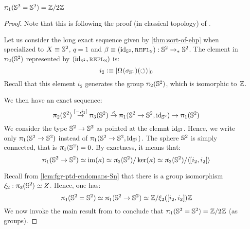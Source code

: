 \documentclass[english,a4paper]{lmcs}
\begin{document}
\begin{thm} \label{thm:Sp-sym=Z/2}
  $\uppi_{1} ({{\mathbb S^{2}}} = {{\mathbb S^{2}}}) = \mathbb{Z}/2 \mathbb{Z}$
  \label{thm:S2-eq-S2-not-simply-connected}
\end{thm}
\begin{proof}
  Note that this is following the proof (in classical topology) of \cite{gwwhitehead}.

  Let us consider the long exact sequence given by \cref{thm:sort-of-ehp} when
  specialized to $X \equiv {{\mathbb S^{2}}}$, $q=1$ and $\beta\equiv (\mathord{\mathrm{id}}_{{\mathbb S^{2}}}, \mathop{{\textsc{refl}}_{\textsc{n}}}): {{\mathbb S^{2}}}
  \to_\ast {{\mathbb S^{2}}}$. The element in $\uppi_{2}({{\mathbb S^{2}}})$ represented by $(\mathord{\mathrm{id}}_{{\mathbb S^{2}}}, \mathop{{\textsc{refl}}_{\textsc{n}}})$
  is:
  \begin{equation}
    i_2 \vcentcolon\equiv \lvert\mathop{\Omega^{}}(\sigma_{{\mathbb S^{1}}})(\mathord{\circlearrowleft})\rvert_0
    \label{eq:def-i2-gen-pi2S2}
  \end{equation}
  Recall that this element $i_2$ generates the group $\uppi_{2}({{\mathbb S^{2}}})$, which is
  isomorphic to $\mathbb{Z}$.

  We then have an exact sequence:
  \begin{equation}
    \hgr 2(\Sp) \overset{[\blank, i_2]} \to \hgr 3(\Sp)
    \overset\kappa \to \fgr (\Sp \to \Sp, \id_\Sp) \to \fgr (\Sp)
    \label{eq:exact-seq-compute-pi1-S2eqS2}
  \end{equation}
  We consider the type ${{\mathbb S^{2}}} \to {{\mathbb S^{2}}}$ as pointed at the elemnt $\mathord{\mathrm{id}}_{{\mathbb S^{2}}}$. Hence,
  we write only $\uppi_{1}({{\mathbb S^{2}}} \to {{\mathbb S^{2}}})$ instead of $\uppi_{1}({{\mathbb S^{2}}}\to{{\mathbb S^{2}}},\mathord{\mathrm{id}}_{{\mathbb S^{2}}})$.
  The sphere ${{\mathbb S^{2}}}$ is simply connected, that is $\uppi_{1}({{\mathbb S^{2}}}) = 0$. By exactness,
  it means that:
  \begin{equation}
    \uppi_{1}({{\mathbb S^{2}}} \to {{\mathbb S^{2}}}) \simeq \operatorname{im}(\kappa) \simeq \uppi_{3}({{\mathbb S^{2}}}) / \ker(\kappa)
    \simeq \uppi_{3} ({{\mathbb S^{2}}}) / \langle [i_2,i_2] \rangle
    \label{eq:fgr-SpeqSp-as-quotient}
  \end{equation}

  Recall from \cref{lem:fgr-ptd-endomaps-Sn} that there is a group isomorphism
  $\xi_2: \uppi_{3} ({{\mathbb S^{2}}}) \simeq Z$. Hence, one has:
  \begin{equation}
    \uppi_{1} ({{\mathbb S^{2}}} = {{\mathbb S^{2}}}) \simeq \uppi_{1} ({{\mathbb S^{2}}} \to {{\mathbb S^{2}}}) \simeq \mathbb{Z} / \xi_2([i_2,i_2])\mathbb{Z}
    \label{eq:fgr-SpeqSp-ZovernZ}
  \end{equation}
  We now invoke the main result from \cite{brunerie:thesis} to conclude that
  $\uppi_{1} ({{\mathbb S^{2}}} = {{\mathbb S^{2}}}) = \mathbb{Z}/2\mathbb{Z}$ (as groups).


\end{proof}
\end{document}
